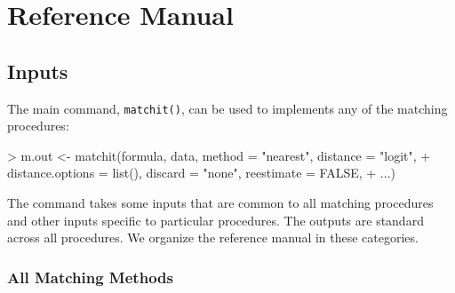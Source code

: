 \documentclass[oneside,letterpaper,titlepage]{article}
\begin{document}



\section{Reference Manual}
\label{sec:reference}

\subsection{Inputs}
\label{subsec:inputs}

The main command, \texttt{matchit()}, can be used to implements any of
the matching procedures:
\begin{Schunk}
\begin{Sinput}
> m.out <- matchit(formula, data, method = "nearest", distance = "logit", 
+     distance.options = list(), discard = "none", reestimate = FALSE, 
+     ...)
\end{Sinput}
\end{Schunk}
The command takes some inputs that are common to all matching
procedures and other inputs specific to particular procedures.  The
outputs are standard across all procedures.  We organize the reference
manual in these categories.

\subsubsection{All Matching Methods}
\label{subsubsec:inputs-all}
\end{document}
